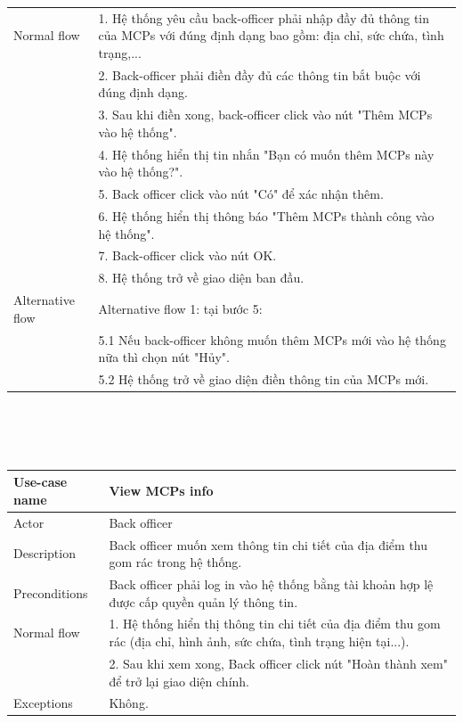 \documentclass[a4paper]{article}
\begin{document}
\begin{enumerate}
\begin{enumerate}
\begin{tabular}{|p{3cm} | p{10cm} |}
         \hline 
         Normal flow 
         &1. Hệ thống yêu cầu back-officer phải nhập đầy đủ thông tin của MCPs với đúng định dạng bao gồm: địa chỉ, sức chứa, tình trạng,...\\
         &2. Back-officer phải điền đầy đủ các thông tin bắt buộc với đúng định dạng. \\
         &3. Sau khi điền xong, back-officer click vào nút "Thêm MCPs vào hệ thống". \\
         &4. Hệ thống hiển thị tin nhắn "Bạn có muốn thêm MCPs này vào hệ thống?". \\
         &5. Back officer click vào nút "Có" để xác nhận thêm.\\
         &6. Hệ thống hiển thị thông báo "Thêm MCPs thành công vào hệ thống". \\
         &7. Back-officer click vào nút OK. \\
         &8. Hệ thống trở về giao diện ban đầu.\\
         \hline
         Alternative flow & 
         Alternative flow 1: tại bước 5: \\
         &5.1 Nếu back-officer không muốn thêm MCPs mới vào hệ thống nữa thì chọn nút "Hủy". \\
         &5.2 Hệ thống trở về giao diện điền thông tin của MCPs mới. \\
         \hline
    \end{tabular}
    \\ \\ \\
    \begin{tabular}{|p{3cm} |p{10cm} |}
         \hline
         Use-case name & \textbf{View MCPs info}  \\
         \hline 
         Actor & Back officer \\
         \hline
         Description & Back officer muốn xem thông tin chi tiết của địa điểm thu gom rác trong hệ thống. \\
         \hline
         Preconditions & Back officer phải log in vào hệ thống bằng tài khoản hợp lệ được cấp quyền quản lý thông tin. \\
         \hline
         Normal flow & 
         1. Hệ thống hiển thị thông tin chi tiết của địa điểm thu gom rác (địa chỉ, hình ảnh, sức chứa, tình trạng hiện tại...). \\
         &2. Sau khi xem xong, Back officer click nút "Hoàn thành xem" để trở lại giao diện chính. \\
         \hline
         Exceptions & Không. \\

\end{tabular}
\end{enumerate}
\end{enumerate}
\end{document}
